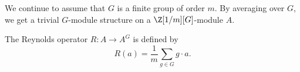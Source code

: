 We continue to assume that $G$ is a finite group of order $m$.
By averaging over $G$, we get a trivial $G$-module structure on a $\Z[1/m][G]$-module $A$.
\begin{definition}
    The Reynolds operator $R: A \to A^G$ is defined by
    \[
        R(a) = \frac{1}{m}\sum_{g\in G} g\cdot a.
    \]
\end{definition}